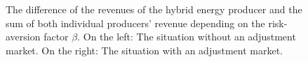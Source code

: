 \begin{figure}[h!]
	\centering
	
	\begin{minipage}{0.95\textwidth}
		\hfill
		
		\caption{The difference of the revenues of the hybrid energy producer and the sum of both individual producers' revenue depending on the risk-aversion factor $\beta$. On the left: The situation without an adjustment market. On the right: The situation with an adjustment market.  }
	\end{minipage}	
\end{figure}

